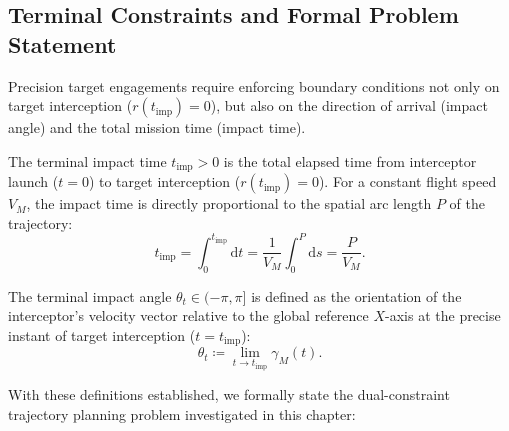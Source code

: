 \subsection{Terminal Constraints and Formal Problem Statement}\label{subsec:ch_DP_problem_statement}
Precision target engagements require enforcing boundary conditions not only on target interception ($r(t_{\text{imp}}) = 0$), but also on the direction of arrival (impact angle) and the total mission time (impact time).
\begin{definition}\label{def:ch_DP_impact_time}
The terminal impact time $t_{\text{imp}} > 0$ is the total elapsed time from interceptor launch ($t = 0$) to target interception ($r(t_{\text{imp}}) = 0$). For a constant flight speed $V_M$, the impact time is directly proportional to the spatial arc length $P$ of the trajectory:
\begin{equation}\label{eq:ch_DP_impact_time_def}
	t_{\text{imp}} = \int_0^{t_{\text{imp}}} \mathrm{d}t = \frac{1}{V_M} \int_0^P \mathrm{d}s = \frac{P}{V_M}.
\end{equation}
\end{definition} 

\begin{definition}\label{def:ch_DP_impact_angle}
\leavevmode\par\noindent
The terminal impact angle $\theta_t \in (-\pi, \pi]$ is defined as the orientation of the interceptor's velocity vector relative to the global reference $X$-axis at the precise instant of target interception ($t = t_{\text{imp}}$):
\begin{equation}\label{eq:ch_DP_approach_def}
	\theta_t \coloneqq \lim_{t \to t_{\text{imp}}} \gamma_M(t).
\end{equation}
\end{definition}



With these definitions established, we formally state the dual-constraint trajectory planning problem investigated in this chapter:

